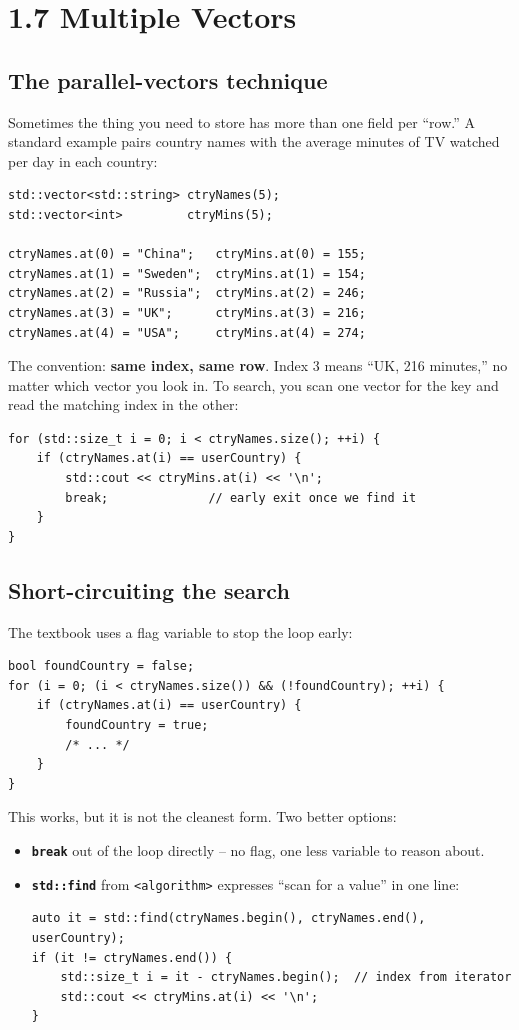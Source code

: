 \documentclass[11pt]{article}
\begin{document}
\section{1.7 Multiple Vectors}

\subsection{The parallel-vectors technique}

Sometimes the thing you need to store has more than one field per
``row.'' A standard example pairs country names with the average minutes
of TV watched per day in each country:

\begin{lstlisting}
std::vector<std::string> ctryNames(5);
std::vector<int>         ctryMins(5);

ctryNames.at(0) = "China";   ctryMins.at(0) = 155;
ctryNames.at(1) = "Sweden";  ctryMins.at(1) = 154;
ctryNames.at(2) = "Russia";  ctryMins.at(2) = 246;
ctryNames.at(3) = "UK";      ctryMins.at(3) = 216;
ctryNames.at(4) = "USA";     ctryMins.at(4) = 274;
\end{lstlisting}

The convention: \textbf{same index, same row}. Index 3 means ``UK,
216 minutes,'' no matter which vector you look in. To search, you scan
one vector for the key and read the matching index in the other:

\begin{lstlisting}
for (std::size_t i = 0; i < ctryNames.size(); ++i) {
    if (ctryNames.at(i) == userCountry) {
        std::cout << ctryMins.at(i) << '\n';
        break;              // early exit once we find it
    }
}
\end{lstlisting}

\subsection{Short-circuiting the search}

The textbook uses a flag variable to stop the loop early:
\begin{lstlisting}
bool foundCountry = false;
for (i = 0; (i < ctryNames.size()) && (!foundCountry); ++i) {
    if (ctryNames.at(i) == userCountry) {
        foundCountry = true;
        /* ... */
    }
}
\end{lstlisting}

This works, but it is not the cleanest form. Two better options:

\begin{itemize}
    \item \textbf{\texttt{break}} out of the loop directly -- no flag,
          one less variable to reason about.
    \item \textbf{\texttt{std::find}} from \texttt{<algorithm>}
          expresses ``scan for a value'' in one line:
\begin{lstlisting}
auto it = std::find(ctryNames.begin(), ctryNames.end(), userCountry);
if (it != ctryNames.end()) {
    std::size_t i = it - ctryNames.begin();  // index from iterator
    std::cout << ctryMins.at(i) << '\n';
}
\end{lstlisting}
\end{itemize}
\end{document}
